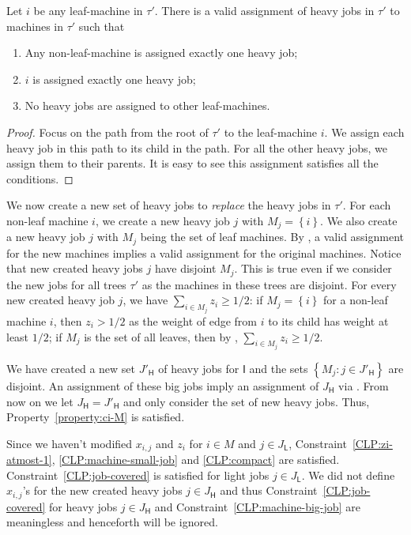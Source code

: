 \documentclass[11pt]{article}
\newcounter{prop}
\newcommand{\set}[1]{\left\{#1\right\}}
\newcommand{\cI}{{\mathsf I}}
\newcommand{\sfH}{{\mathsf H}}
\newcommand{\sfL}{{\mathsf L}}
\begin{document}
\begin{lemma}
\label{lemma:choose-any-leaf-machine}
\label{lem:choose-any-leaf-machine}

Let $i$ be any leaf-machine in $\tau'$. There is a valid assignment of heavy jobs in $\tau'$ to machines in $\tau'$ such that
\begin{enumerate}[itemsep=-2pt]
\item Any non-leaf-machine is assigned exactly one heavy job;
\item $i$ is assigned exactly one heavy job;
\item No heavy jobs are assigned to other leaf-machines.
\end{enumerate}
\end{lemma}
\begin{proof}
Focus on the path from the root of $\tau'$ to the leaf-machine $i$.  We assign each heavy job in this path to its child in the path.  For all the other heavy jobs, we assign them to their parents.  It is easy to see this assignment satisfies all the conditions.
\end{proof}
We now create a new set of heavy jobs to \emph{replace} the heavy jobs in $\tau'$.  For each non-leaf machine $i$, we create a new heavy job $j$ with $M_j = \set{i}$. We also create a new heavy job $j$ with $M_j$ being the set of leaf machines.  By , a valid assignment for the new machines implies a valid assignment for the original machines.  Notice that new created heavy jobs $j$ have disjoint $M_j$. This is true even if we consider the new jobs for all trees $\tau'$ as the machines in these trees are disjoint. For every new created heavy job $j$, we have $\sum_{i \in M_j} z_i \geq 1/2$: if $M_j = \set{i}$ for a non-leaf machine $i$, then $z_i > 1/2$ as the weight of edge from $i$ to its child has weight at least $1/2$; if $M_j$ is the set of all leaves, then by , $\sum_{i \in M_j}z_i \geq 1/2$. 

We have created a new set $J'_\sfH$ of heavy jobs for $\cI$ and the sets $\set{M_j : j \in J'_\sfH}$ are disjoint. An assignment of these big jobs imply an assignment of $J_\sfH$ via . From now on we let $J_\sfH = J'_\sfH$ and only consider the set of new heavy jobs. Thus, Property~\ref{property:ci-M} is satisfied.  

Since we haven't modified $x_{i,j}$ and $z_i$ for $i \in M$ and $j\in J_\sfL$, Constraint~\eqref{CLP:zi-atmost-1}, \eqref{CLP:machine-small-job} and \eqref{CLP:compact} are satisfied. Constraint~\eqref{CLP:job-covered} is satisfied for light jobs $j \in J_\sfL$. We did not define $x_{i,j}$'s for the new created heavy jobs $j \in J_\sfH$ and thus Constraint~\eqref{CLP:job-covered} for heavy jobs $j \in J_\sfH$ and Constraint~\eqref{CLP:machine-big-job} are meaningless and henceforth will be ignored. 
\end{document}

